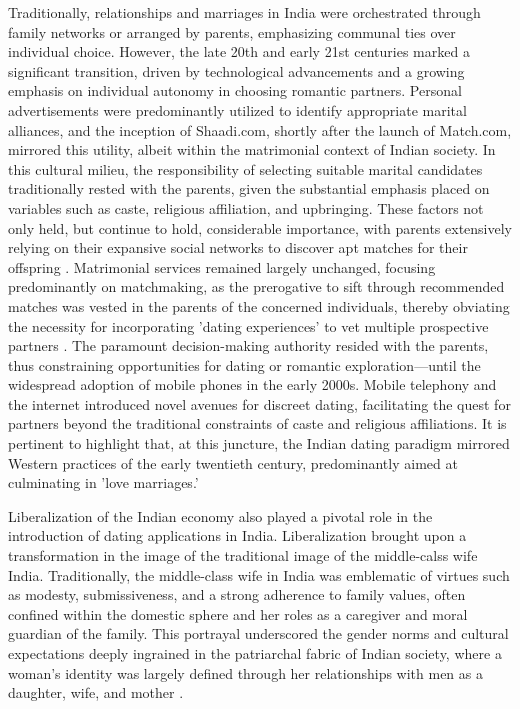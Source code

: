 Traditionally, relationships and marriages in India were orchestrated through family networks or arranged by parents, emphasizing communal ties over individual choice. However, the late 20th and early 21st centuries marked a significant transition, driven by technological advancements and a growing emphasis on individual autonomy in choosing romantic partners. Personal advertisements were predominantly utilized to identify appropriate marital alliances, and the inception of Shaadi.com, shortly after the launch of Match.com, mirrored this utility, albeit within the matrimonial context of Indian society. In this cultural milieu, the responsibility of selecting suitable marital candidates traditionally rested with the parents, given the substantial emphasis placed on variables such as caste, religious affiliation, and upbringing. These factors not only held, but continue to hold, considerable importance, with parents extensively relying on their expansive social networks to discover apt matches for their offspring \cite{sharma_towards_2019, seth_online_2008}. Matrimonial services remained largely unchanged, focusing predominantly on matchmaking, as the prerogative to sift through recommended matches was vested in the parents of the concerned individuals, thereby obviating the necessity for incorporating 'dating experiences' to vet multiple prospective partners \cite{titzmann_changing_2013}. The paramount decision-making authority resided with the parents, thus constraining opportunities for dating or romantic exploration—until the widespread adoption of mobile phones in the early 2000s. Mobile telephony and the internet introduced novel avenues for discreet dating, facilitating the quest for partners beyond the traditional constraints of caste and religious affiliations. It is pertinent to highlight that, at this juncture, the Indian dating paradigm mirrored Western practices of the early twentieth century, predominantly aimed at culminating in 'love marriages.'

Liberalization of the Indian economy also played a pivotal role in the introduction of dating applications in India. Liberalization brought upon a transformation in the image of the traditional image of the middle-calss wife India. Traditionally, the middle-class wife in India was emblematic of virtues such as modesty, submissiveness, and a strong adherence to family values, often confined within the domestic sphere and her roles as a caregiver and moral guardian of the family. This portrayal underscored the gender norms and cultural expectations deeply ingrained in the patriarchal fabric of Indian society, where a woman's identity was largely defined through her relationships with men as a daughter, wife, and mother \cite{Dell_2005}.

